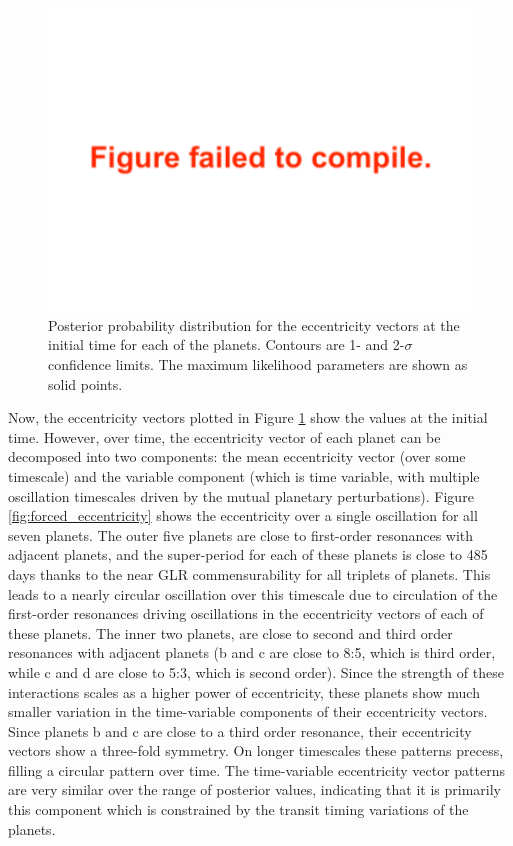 \documentclass[fleqn,usenatbib]{mnras} %
\begin{document}
\begin{figure}
    \centering
    \includegraphics[width=\hsize]{figures/esin_vs_ecos.pdf}
    \caption{Posterior probability distribution for the eccentricity vectors  at the
    initial time for each of the planets.  Contours are 1- and 2-$\sigma$ confidence limits.  
    The maximum likelihood parameters are shown as solid points.}
    \label{fig:eccentricity_vectors}
\end{figure}

Now, the eccentricity vectors plotted in Figure \ref{fig:eccentricity_vectors} show the
values at the initial time. However, over time, the eccentricity vector of each planet can be decomposed into two components: the mean eccentricity vector (over some timescale) and the variable component (which is time variable, with multiple oscillation timescales driven by the mutual planetary perturbations).   Figure \ref{fig:forced_eccentricity}
shows the eccentricity over a single oscillation for all seven planets.  The outer five
planets are close to first-order resonances with adjacent planets, and the super-period
for each of these planets is close to 485 days thanks to the near GLR commensurability
for all triplets of planets.  This leads to a nearly circular oscillation over this timescale
due to circulation of the first-order resonances driving oscillations in the eccentricity
vectors of each of these planets.  The inner two planets, are close to second and third
order resonances with adjacent planets (b and c are close to 8:5, which is third order,
while c and d are close to 5:3, which is second order).  Since the strength of these
interactions scales as a higher power of eccentricity, these planets show much smaller variation
in the time-variable components of their eccentricity vectors.  Since planets b and c are 
close to a third order resonance,
their eccentricity vectors show a three-fold symmetry.  On longer timescales these patterns
precess, filling a circular pattern over time.  The time-variable eccentricity vector patterns are
very similar over the range of posterior values, indicating that it is primarily this
component which is constrained by the transit timing variations of the planets.
\end{document}
